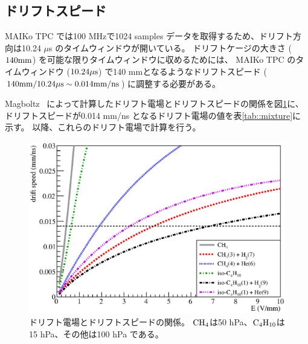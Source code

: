 \subsection{ドリフトスピード}
MAIKo TPC では100 MHzで1024 samples データを取得するため、ドリフト方向は10.24 $\mu$s のタイムウィンドウが開いている。
ドリフトケージの大きさ ($140\rm{mm}$) を可能な限りタイムウィンドウに収めるためには、
MAIKo TPC のタイムウィンドウ ($10.24\rm{\mu s}$) で140 mmとなるようなドリフトスピード
($140\rm{mm}/10.24\rm{\mu s} \sim 0.014\rm{mm/ns}$) に調整する必要がある。

Magboltz~\cite{magboltz} によって計算したドリフト電場とドリフトスピードの関係を図\ref{fig::drift_v_magboltz}に、
ドリフトスピードが0.014 mm/ns となるドリフト電場の値を表\ref{tab::mixture}に示す。
以降、これらのドリフト電場で計算を行う。
\begin{figure}
  \centering
  \includegraphics[clip, width=0.9\columnwidth]{eps/drift_v_magboltz.eps}
  \caption[ドリフト電場とドリフトスピードの関係。]
          {ドリフト電場とドリフトスピードの関係。
          ${\rm CH_{4}}$は50 hPa、${\rm C_{4}H_{10}}$は15 hPa、その他は100 hPa である。}
  \label{fig::drift_v_magboltz}
\end{figure}

